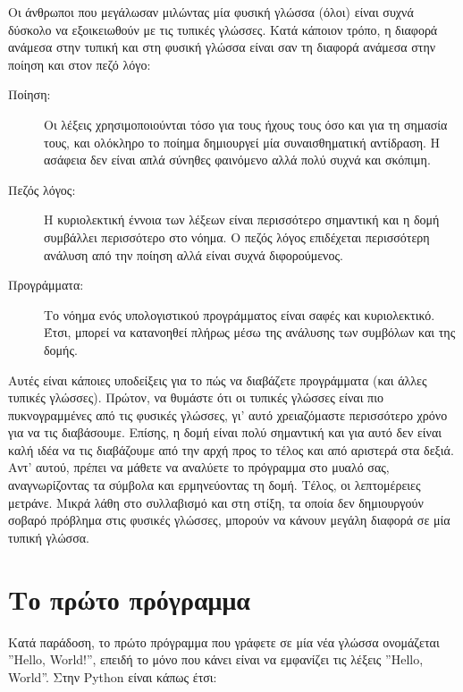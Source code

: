 \documentclass[10pt]{book}
\begin{document}
Οι άνθρωποι που μεγάλωσαν μιλώντας μία φυσική γλώσσα (όλοι) είναι
συχνά δύσκολο να εξοικειωθούν με τις τυπικές γλώσσες.  Κατά κάποιον τρόπο,
η διαφορά ανάμεσα στην τυπική και στη φυσική γλώσσα είναι σαν τη διαφορά
ανάμεσα στην ποίηση και στον πεζό λόγο:

\begin{description}

\item[Ποίηση:] Οι λέξεις χρησιμοποιούνται τόσο για τους ήχους τους
όσο και για τη σημασία τους, και ολόκληρο το ποίημα δημιουργεί μία
συναισθηματική αντίδραση.  Η ασάφεια δεν είναι απλά σύνηθες φαινόμενο
αλλά πολύ συχνά και σκόπιμη.

\item[Πεζός λόγος:] Η κυριολεκτική έννοια των λέξεων είναι περισσότερο
σημαντική και η δομή συμβάλλει περισσότερο στο νόημα.  Ο πεζός λόγος
επιδέχεται περισσότερη ανάλυση από την ποίηση αλλά είναι συχνά
διφορούμενος.

\item[Προγράμματα:] Το νόημα ενός υπολογιστικού προγράμματος είναι
σαφές και κυριολεκτικό. Έτσι, μπορεί να κατανοηθεί πλήρως μέσω της ανάλυσης
των συμβόλων και της δομής.

\end{description}

Αυτές είναι κάποιες υποδείξεις για το πώς να διαβάζετε προγράμματα (και άλλες
τυπικές γλώσσες). Πρώτον, να θυμάστε ότι οι τυπικές γλώσσες είναι
πιο πυκνογραμμένες από τις φυσικές γλώσσες, γι' αυτό χρειαζόμαστε
περισσότερο χρόνο για να τις διαβάσουμε. Επίσης, η δομή είναι πολύ σημαντική
και για αυτό δεν είναι καλή ιδέα να τις διαβάζουμε από την αρχή προς
το τέλος και από αριστερά στα δεξιά. Αντ' αυτού, πρέπει να μάθετε να αναλύετε
το πρόγραμμα στο μυαλό σας, αναγνωρίζοντας τα σύμβολα και ερμηνεύοντας
τη δομή. Τέλος, οι λεπτομέρειες μετράνε. Μικρά λάθη στο συλλαβισμό και
στη στίξη, τα οποία δεν δημιουργούν σοβαρό πρόβλημα στις φυσικές γλώσσες,
μπορούν να κάνουν μεγάλη διαφορά σε μία τυπική γλώσσα.


\section{Το πρώτο πρόγραμμα}
\label{hello}

Κατά παράδοση, το πρώτο πρόγραμμα που γράφετε σε μία νέα
γλώσσα ονομάζεται ''Hello, World!'', επειδή το μόνο που κάνει
είναι να εμφανίζει τις λέξεις ''Hello, World''. Στην Python
είναι κάπως έτσι:
\end{document}

